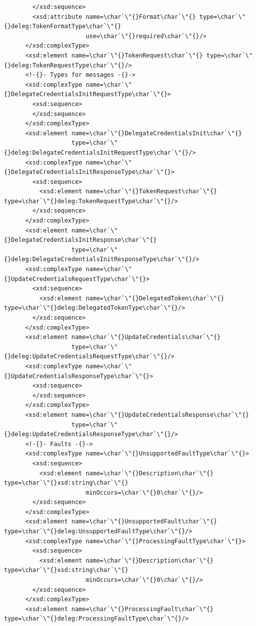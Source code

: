 \documentclass{article}                            %
\begin{document}
\begin{footnotesize}
\begin{verbatim}
        </xsd:sequence>
        <xsd:attribute name=\char`\"{}Format\char`\"{} type=\char`\"{}deleg:TokenFormatType\char`\"{}
                       use=\char`\"{}required\char`\"{}/>
      </xsd:complexType>
      <xsd:element name=\char`\"{}TokenRequest\char`\"{} type=\char`\"{}deleg:TokenRequestType\char`\"{}/>
      <!-{}- Types for messages -{}->
      <xsd:complexType name=\char`\"{}DelegateCredentialsInitRequestType\char`\"{}>
        <xsd:sequence>
        </xsd:sequence>
      </xsd:complexType>
      <xsd:element name=\char`\"{}DelegateCredentialsInit\char`\"{}
                   type=\char`\"{}deleg:DelegateCredentialsInitRequestType\char`\"{}/>
      <xsd:complexType name=\char`\"{}DelegateCredentialsInitResponseType\char`\"{}>
        <xsd:sequence>
          <xsd:element name=\char`\"{}TokenRequest\char`\"{} type=\char`\"{}deleg:TokenRequestType\char`\"{}/>
        </xsd:sequence>
      </xsd:complexType>
      <xsd:element name=\char`\"{}DelegateCredentialsInitResponse\char`\"{}
                   type=\char`\"{}deleg:DelegateCredentialsInitResponseType\char`\"{}/>
      <xsd:complexType name=\char`\"{}UpdateCredentialsRequestType\char`\"{}>
        <xsd:sequence>
          <xsd:element name=\char`\"{}DelegatedToken\char`\"{} type=\char`\"{}deleg:DelegatedTokenType\char`\"{}/>
        </xsd:sequence>
      </xsd:complexType>
      <xsd:element name=\char`\"{}UpdateCredentials\char`\"{}
                   type=\char`\"{}deleg:UpdateCredentialsRequestType\char`\"{}/>
      <xsd:complexType name=\char`\"{}UpdateCredentialsResponseType\char`\"{}>
        <xsd:sequence>
        </xsd:sequence>
      </xsd:complexType>
      <xsd:element name=\char`\"{}UpdateCredentialsResponse\char`\"{}
                   type=\char`\"{}deleg:UpdateCredentialsResponseType\char`\"{}/>
      <!-{}- Faults -{}->
      <xsd:complexType name=\char`\"{}UnsupportedFaultType\char`\"{}>
        <xsd:sequence>
          <xsd:element name=\char`\"{}Description\char`\"{} type=\char`\"{}xsd:string\char`\"{}
                       minOccurs=\char`\"{}0\char`\"{}/>
        </xsd:sequence>
      </xsd:complexType>
      <xsd:element name=\char`\"{}UnsupportedFault\char`\"{} type=\char`\"{}deleg:UnsupportedFaultType\char`\"{}/>
      <xsd:complexType name=\char`\"{}ProcessingFaultType\char`\"{}>
        <xsd:sequence>
          <xsd:element name=\char`\"{}Description\char`\"{} type=\char`\"{}xsd:string\char`\"{}
                       minOccurs=\char`\"{}0\char`\"{}/>
        </xsd:sequence>
      </xsd:complexType>
      <xsd:element name=\char`\"{}ProcessingFault\char`\"{} type=\char`\"{}deleg:ProcessingFaultType\char`\"{}/>

\end{verbatim}
\end{footnotesize}
\end{document}

